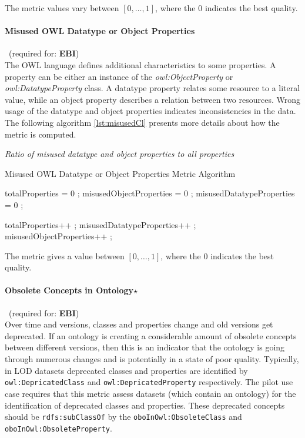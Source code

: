 The metric values vary between  $[0,\ldots,1]$, where  the 0 indicates the best quality.

\paragraph{Misused OWL Datatype or Object Properties}~(required for: \textbf{EBI})~\\
The OWL language defines additional characteristics to some properties. 
A property can be either an instance of the \textit{owl:ObjectProperty} or \textit{owl:DatatypeProperty} class.
A datatype property relates some resource to a literal value, while an object property describes a relation between two resources.
Wrong usage of the datatype and object properties indicates inconsistencies in the data.
The following algorithm  \ref{lst:misusedCl} presents more details about how the metric is computed.

\begin{mdframed}[style=metricdefinition]
\emph{Ratio of misused datatype and object properties to all properties}
\end{mdframed}

\begin{algorithm}
\caption{Misused OWL Datatype or Object Properties Metric Algorithm} \label{lst:misusedCl}
\begin{algorithmic}[1]
\State totalProperties = 0 ;
\State misusedObjectProperties = 0 ;
\State misusedDatatypeProperties = 0 ;
\EndProcedure

 totalProperties++ ;\EndIf 
{} misusedDatatypeProperties++ ; \EndIf 
{} misusedObjectProperties++ ; \EndIf 
\EndProcedure
\end{algorithmic}
\end{algorithm}

The metric gives a value between $[0,\ldots,1]$, where  the 0 indicates the best quality.

\paragraph{Obsolete Concepts in Ontology$\star$}~(required for: \textbf{EBI})~\\
Over time and versions, classes and properties change and old versions get deprecated.
If an ontology is creating a considerable amount of obsolete concepts between different versions, then this is an indicator that the ontology is going through numerous changes and is potentially in a state of poor quality.
Typically, in LOD datasets deprecated classes and properties are identified by \texttt{owl:DepricatedClass} and \texttt{owl:DepricatedProperty} respectively.
The pilot use case requires that this metric assess datasets (which contain an ontology) for the identification of deprecated classes and properties.
These deprecated concepts should be \texttt{rdfs:subClassOf} by the \texttt{oboInOwl:ObsoleteClass} and \texttt{oboInOwl:ObsoleteProperty}.

